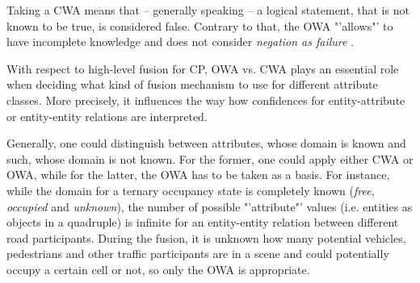 Taking a CWA means that – generally speaking – a logical statement, that is not known to be true, is considered false. Contrary to that, the OWA "'allows"' to have incomplete knowledge and does not consider \textit{negation as failure} \cite{wiki:neaf}. 

With respect to high-level fusion for CP, OWA vs. CWA plays an essential role when deciding what kind of fusion mechanism to use for different attribute classes. More precisely, it influences the way how confidences for entity-attribute or entity-entity relations are interpreted. 

Generally, one could distinguish between attributes, whose domain is known and such, whose domain is not known. For the former, one could apply either CWA or OWA, while for the latter, the OWA has to be taken as a basis. For instance, while the domain for a ternary occupancy state is completely known (\textit{free}, \textit{occupied} and \textit{unknown}), the number of possible "'attribute"' values (i.e. entities as objects in a quadruple) is infinite for an entity-entity relation between different road participants. During the fusion, it is unknown how many potential vehicles, pedestrians and other traffic participants are in a scene and could potentially occupy a certain cell or not, so only the OWA is appropriate.


